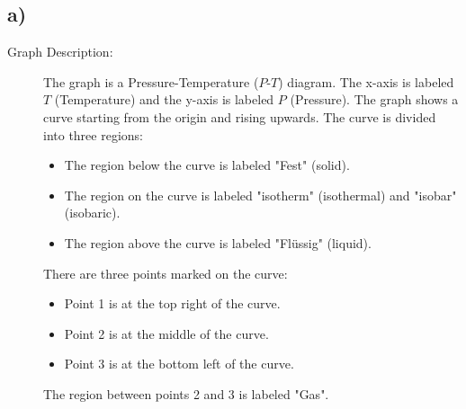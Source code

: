 

\subsection*{a)}

\begin{description}
    \item[Graph Description:] The graph is a Pressure-Temperature ($P$-$T$) diagram. The x-axis is labeled $T$ (Temperature) and the y-axis is labeled $P$ (Pressure). The graph shows a curve starting from the origin and rising upwards. The curve is divided into three regions:
    \begin{itemize}
        \item The region below the curve is labeled "Fest" (solid).
        \item The region on the curve is labeled "isotherm" (isothermal) and "isobar" (isobaric).
        \item The region above the curve is labeled "Flüssig" (liquid).
    \end{itemize}
    There are three points marked on the curve:
    \begin{itemize}
        \item Point 1 is at the top right of the curve.
        \item Point 2 is at the middle of the curve.
        \item Point 3 is at the bottom left of the curve.
    \end{itemize}
    The region between points 2 and 3 is labeled "Gas".
\end{description}
